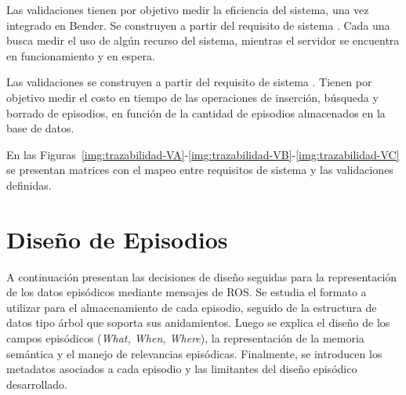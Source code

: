 Las validaciones  tienen por objetivo medir la eficiencia del sistema, una vez integrado en Bender. Se construyen a partir del requisito de sistema . Cada una busca medir el uso de algún recurso del sistema, mientras el servidor se encuentra en funcionamiento y en espera. 

Las validaciones  se construyen a partir del requisito de sistema . Tienen por objetivo medir el costo en tiempo de las operaciones de inserción, búsqueda y borrado de episodios, en función de la cantidad de episodios almacenados en la base de datos.

En las Figuras~\ref{img:trazabilidad-VA}-\ref{img:trazabilidad-VB}-\ref{img:trazabilidad-VC} se presentan matrices con el mapeo entre requisitos de sistema y las validaciones definidas.





\section{Diseño de Episodios}\label{sec:ep_design}

A continuación presentan las decisiones de diseño seguidas para la representación de los datos episódicos mediante mensajes de ROS. Se estudia el formato a utilizar para el almacenamiento de cada episodio, seguido de la estructura de datos tipo árbol que soporta sus anidamientos. Luego se explica el diseño de los campos episódicos (\textit{What, When, Where}), la representación de la memoria semántica y el manejo de relevancias episódicas. Finalmente, se introducen los metadatos asociados a cada episodio y las limitantes del diseño episódico desarrollado.


